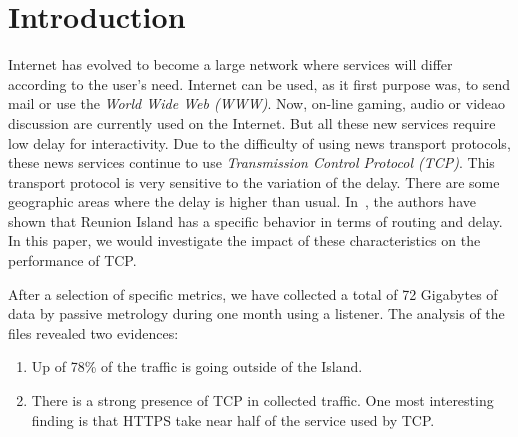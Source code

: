 \documentclass[10pt, conference, a4paper, twocolumns]{IEEEtran}
\def\rouge#1{\textcolor{red}{#1}}
\def\yassine#1{\textbf{\textcolor{blue}{yassine : #1}}}
\begin{document}
\section{Introduction}
\label{sec:intro}
Internet has evolved to become a large network where services will differ according to the user's need. Internet can be used, as it first purpose was, to send mail or use the \emph{World Wide Web (WWW)}. Now, on-line gaming, audio or videao discussion are currently used on the Internet. But all these new services require low delay for interactivity. %
Due to the difficulty of using news transport protocols, these news services continue to use \emph{Transmission Control Protocol (TCP)}. This transport protocol is very sensitive to the variation of the delay. There are some geographic areas where the delay is higher than usual. In~\cite{Noordally2016}, the authors have shown that Reunion Island has a specific %
behavior in terms of routing and delay. In this paper, we would investigate the impact of these characteristics on the performance of TCP. 

After a selection of specific metrics, we have collected a total of 72 Gigabytes of data by passive metrology during one month using a listener. The analysis of the files revealed two evidences:
\begin{enumerate}
\item Up of 78\% of the traffic is going outside of the Island.
\item There is a strong presence of TCP in collected traffic. One most interesting finding is that HTTPS take near half of the service used by TCP.
\end{enumerate}
\end{document}
